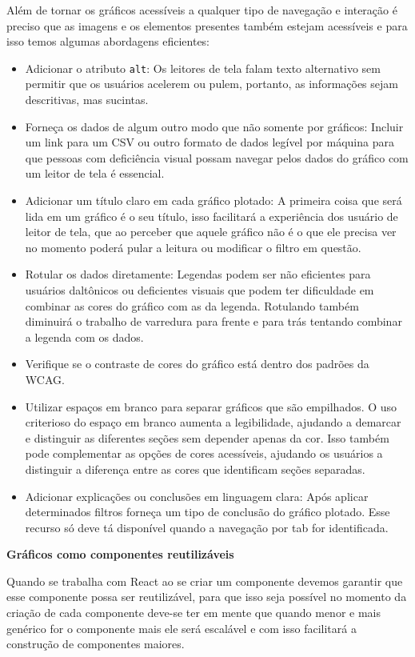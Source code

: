 {{Além de tornar os gráficos acessíveis a qualquer tipo de navegação e interação é preciso que as imagens e os elementos presentes também estejam acessíveis e para isso temos algumas abordagens eficientes:
\begin{itemize}
    \item Adicionar o atributo \lstinline{alt}: Os leitores de tela falam texto alternativo sem permitir que os usuários acelerem ou pulem, portanto, as informações sejam descritivas, mas sucintas.
    \item Forneça os dados de algum outro modo que não somente por gráficos: Incluir um link para um CSV ou outro formato de dados legível por máquina para que pessoas com deficiência visual possam navegar pelos dados do gráfico com um leitor de tela é essencial.
    \item Adicionar um título claro em cada gráfico plotado: A primeira coisa que será lida em um gráfico é o seu título, isso facilitará a experiência dos usuário de leitor de tela, que ao perceber que aquele gráfico não é o que ele precisa ver no momento poderá pular a leitura ou modificar o filtro em questão.
    \item Rotular os dados diretamente: Legendas podem ser não eficientes para usuários daltônicos ou deficientes visuais que podem ter dificuldade em combinar as cores do gráfico com as da legenda. Rotulando também diminuirá o trabalho de varredura para frente e para trás tentando combinar a legenda com os dados.
    \item Verifique se o contraste de cores do gráfico está dentro dos padrões da WCAG.
    \item Utilizar espaços em branco para separar gráficos que são empilhados. O uso criterioso do espaço em branco aumenta a legibilidade, ajudando a demarcar e distinguir as diferentes seções sem depender apenas da cor. Isso também pode complementar as opções de cores acessíveis, ajudando os usuários a distinguir a diferença entre as cores que identificam seções separadas.
    \item Adicionar explicações ou conclusões em linguagem clara: Após aplicar determinados filtros forneça um tipo de conclusão do gráfico plotado. Esse recurso só deve tá disponível quando a navegação por tab for identificada. 
\end{itemize}


\textbf{Gráficos como componentes reutilizáveis}

{Quando se trabalha com React ao se criar um componente devemos garantir que esse componente possa ser reutilizável, para que isso seja possível no momento da criação de cada componente deve-se ter em mente que quando menor e mais genérico for o componente mais ele será escalável e com isso facilitará a construção de componentes maiores.

}}}
